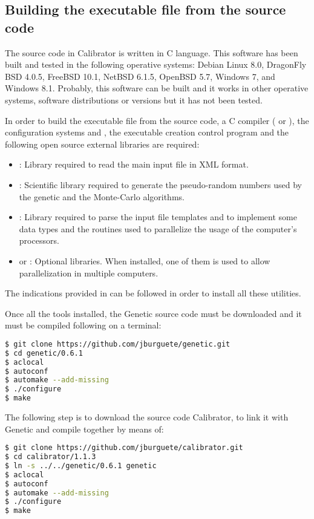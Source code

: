 \documentclass[review,authoryear]{elsarticle}
\begin{document}
\subsection{Building the executable file from the source code}

The source code in Calibrator is written in C language. This software has
been built and tested in the following operative systems:
Debian Linux 8.0,
DragonFly BSD 4.0.5,
FreeBSD 10.1,
NetBSD 6.1.5,
OpenBSD 5.7,
Windows 7\footnotemark[1],
and Windows 8.1\footnotemark[1].
Probably, this software can be built and it works in other operative systems,
software distributions or versions but it has not been tested.

In order to build the executable file from the source code, a C compiler (\citet{gcc} or \citet{clang}), the configuration systems \citet{autoconf} and \citet{automake}, the executable creation control program \citet{gnumake} and the following open source external libraries are required:
\begin{itemize}
\item\citet{libxml}: Library required to read the main input file in XML format.
\item\citet{gsl}: Scientific library required to generate the pseudo-random numbers used by the genetic and the Monte-Carlo algorithms.
\item\citet{glib}: Library required to parse the input file templates and to implement some data types and the routines used to parallelize the usage of the computer's processors.
\item\citet{openmpi} or \citet{mpich}: Optional libraries. When installed, one
of them is used to allow parallelization in multiple computers.
\end{itemize}
The indications provided in \citet{install-unix} can be followed in order to install all these utilities.

Once all the tools installed, the Genetic source code must be downloaded and it must be compiled following on a terminal:
\begin{lstlisting}[language=bash,basicstyle=\scriptsize]
$ git clone https://github.com/jburguete/genetic.git
$ cd genetic/0.6.1
$ aclocal
$ autoconf
$ automake --add-missing
$ ./configure
$ make
\end{lstlisting}

The following step is to download the source code Calibrator, to link it with Genetic and compile together by means of:
\begin{lstlisting}[language=bash,basicstyle=\scriptsize]
$ git clone https://github.com/jburguete/calibrator.git
$ cd calibrator/1.1.3
$ ln -s ../../genetic/0.6.1 genetic
$ aclocal
$ autoconf
$ automake --add-missing
$ ./configure
$ make
\end{lstlisting}
\end{document}
